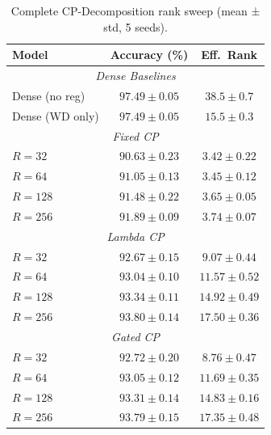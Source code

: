 \documentclass[10pt]{article}
\begin{document}
\begin{table}[H]
    \caption{Complete CP-Decomposition rank sweep (mean ± std, 5 seeds).}
    \label{tab:app_cp_sweep}
    \centering
    \small
    \begin{tabular}{lcc}
        \toprule
        \textbf{Model} & \textbf{Accuracy (\%)} & \textbf{Eff.\ Rank} \\
        \midrule
        \multicolumn{3}{c}{\textit{Dense Baselines}} \\
        Dense (no reg) & $97.49 \pm 0.05$ & $38.5 \pm 0.7$ \\
        Dense (WD only) & $97.49 \pm 0.05$ & $15.5 \pm 0.3$ \\
        \midrule
        \multicolumn{3}{c}{\textit{Fixed CP}} \\
        $R=32$ & $90.63 \pm 0.23$ & $3.42 \pm 0.22$ \\
        $R=64$ & $91.05 \pm 0.13$ & $3.45 \pm 0.12$ \\
        $R=128$ & $91.48 \pm 0.22$ & $3.65 \pm 0.05$ \\
        $R=256$ & $91.89 \pm 0.09$ & $3.74 \pm 0.07$ \\
        \midrule
        \multicolumn{3}{c}{\textit{Lambda CP}} \\
        $R=32$ & $92.67 \pm 0.15$ & $9.07 \pm 0.44$ \\
        $R=64$ & $93.04 \pm 0.10$ & $11.57 \pm 0.52$ \\
        $R=128$ & $93.34 \pm 0.11$ & $14.92 \pm 0.49$ \\
        $R=256$ & $93.80 \pm 0.14$ & $17.50 \pm 0.36$ \\
        \midrule
        \multicolumn{3}{c}{\textit{Gated CP}} \\
        $R=32$ & $92.72 \pm 0.20$ & $8.76 \pm 0.47$ \\
        $R=64$ & $93.05 \pm 0.12$ & $11.69 \pm 0.35$ \\
        $R=128$ & $93.31 \pm 0.14$ & $14.83 \pm 0.16$ \\
        $R=256$ & $93.79 \pm 0.15$ & $17.35 \pm 0.48$ \\
        \bottomrule
    \end{tabular}
\end{table}


\end{document}
